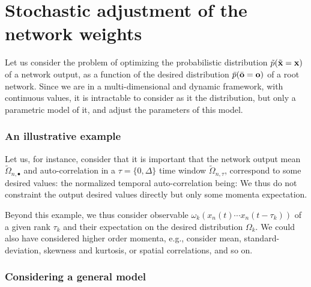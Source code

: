 \section{Stochastic adjustment of the network weights}\label{stochastic}

Let us consider the problem of optimizing the probabilistic distribution $\tilde{p}(\tilde{\bf x} = {\bf x})$ of a network output, as a function of the desired distribution $\bar{p}(\bar{\bf o} = {\bf o})$ of a root network. Since we are in a multi-dimensional and dynamic framework, with continuous values, it is  intractable  to consider as it the distribution, but only a parametric model of it, and adjust the parameters of this model. 

\subsubsection*{An illustrative example}

Let us, for instance, consider that it is important that the network output mean $\tilde{\Omega}_{n,\bullet}$ and auto-correlation in a $\tau = \{0, \Delta\}$ time window $\tilde{\Omega}_{n,\tau}$, correspond to some desired values:
the normalized temporal auto-correlation being: 
We thus do not constraint the output desired values directly but only some momenta expectation.

Beyond this example, we thus consider observable $\omega_{k}(x_n(t) \cdots x_n(t-\tau_k))$ of a given rank $\tau_k$ and their expectation on the desired distribution $\Omega_{k}$. We could also have considered higher order momenta, e.g., consider mean, standard-deviation, skewness and kurtosis, or spatial correlations, and so on.

\subsubsection*{Considering a general model}

